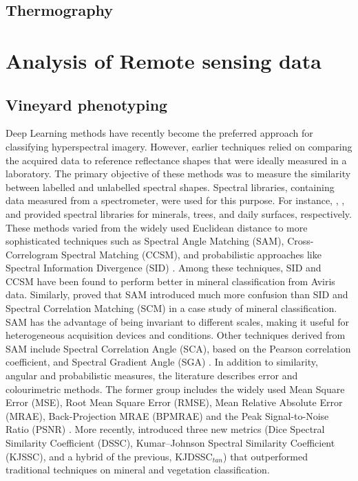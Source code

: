 \subsection{Thermography}



\section{Analysis of Remote sensing data}

\subsection{Vineyard phenotyping}

Deep Learning methods have recently become the preferred approach for classifying hyperspectral imagery. However, earlier techniques relied on comparing the acquired data to reference reflectance shapes that were ideally measured in a laboratory. The primary objective of these methods was to measure the similarity between labelled and unlabelled spectral shapes. Spectral libraries, containing data measured from a spectrometer, were used for this purpose. For instance, \cite{kokaly_usgs_2017}, \cite{dutta_characterizing_2017}, and \cite{matusik_data-driven_2003} provided spectral libraries for minerals, trees, and daily surfaces, respectively. These methods varied from the widely used Euclidean distance to more sophisticated techniques such as Spectral Angle Matching (SAM), Cross-Correlogram Spectral Matching (CCSM), and probabilistic approaches like Spectral Information Divergence (SID) \cite{pu_hyperspectral_2017}. Among these techniques, SID and CCSM have been found to perform better in mineral classification from Aviris data. Similarly, \cite{van_der_meer_effectiveness_2006} proved that SAM introduced much more confusion than SID and Spectral Correlation Matching (SCM) in a case study of mineral classification. SAM has the advantage of being invariant to different scales, making it useful for heterogeneous acquisition devices and conditions. Other techniques derived from SAM include Spectral Correlation Angle (SCA), based on the Pearson correlation coefficient, and Spectral Gradient Angle (SGA) \cite{ren_novel_2022}. In addition to similarity, angular and probabilistic measures, the literature describes error and colourimetric methods. The former group includes the widely used Mean Square Error (MSE), Root Mean Square Error (RMSE), Mean Relative Absolute Error (MRAE), Back-Projection MRAE (BPMRAE) and the Peak Signal-to-Noise Ratio (PSNR) \cite{agarla_analysis_2021}. More recently, \cite{kumar_new_2021} introduced three new metrics (Dice Spectral Similarity Coefficient (DSSC), Kumar–Johnson Spectral Similarity Coefficient (KJSSC), and a hybrid of the previous, KJDSSC$_{\textit{tan}}$) that outperformed traditional techniques on mineral and vegetation classification.

